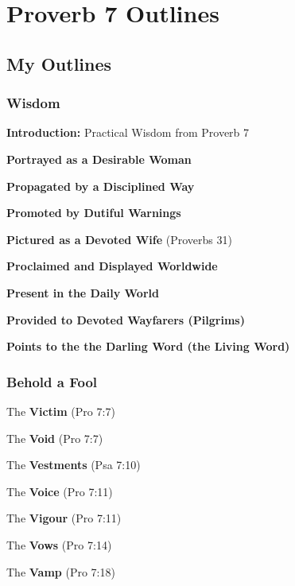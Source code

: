 \section{Proverb 7 Outlines}

\subsection{My Outlines}

\subsubsection{Wisdom}
\textbf{Introduction: }Practical Wisdom from Proverb 7
\begin{compactenum}[I.][8]
    \item \textbf{Portrayed as a Desirable Woman}
    \item \textbf{Propagated by a Disciplined Way}
    \item \textbf{Promoted by Dutiful Warnings}
    \item \textbf{Pictured as a Devoted Wife} (Proverbs 31)
    \item \textbf{Proclaimed and Displayed Worldwide}
    \item \textbf{Present in the Daily World}
    \item \textbf{Provided to Devoted Wayfarers (Pilgrims)}
    \item \textbf{Points to the the Darling Word (the Living Word)}
\end{compactenum}


\subsubsection{Behold a Fool}

\begin{compactenum}[I.][8]
    \item The \textbf{Victim}  (Pro 7:7)
    \item The \textbf{Void}  (Pro 7:7)
    \item The \textbf{Vestments}  (Psa 7:10)
    \item The \textbf{Voice}  (Pro 7:11)
    \item The \textbf{Vigour}  (Pro 7:11)
    \item The \textbf{Vows}  (Pro 7:14)
    \item The \textbf{Vamp}  (Pro 7:18)
\end{compactenum}


